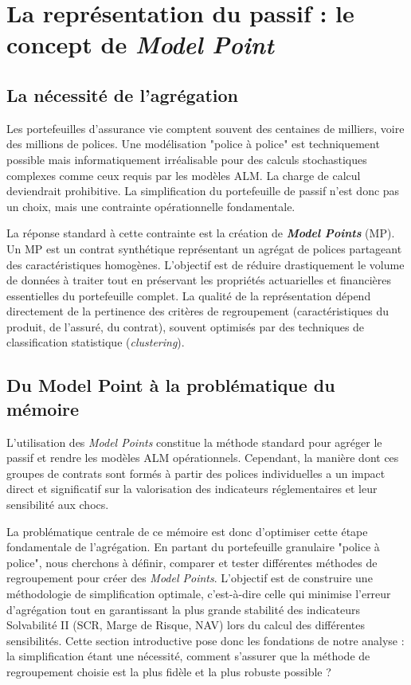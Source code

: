 \section{La représentation du passif : le concept de \textit{Model Point}}
\label{sec:mp}

\subsection{La nécessité de l'agrégation}

Les portefeuilles d'assurance vie comptent souvent des centaines de milliers, voire des millions de polices. Une modélisation "police à police" est techniquement possible mais informatiquement irréalisable pour des calculs stochastiques complexes comme ceux requis par les modèles ALM. La charge de calcul deviendrait prohibitive. La simplification du portefeuille de passif n'est donc pas un choix, mais une contrainte opérationnelle fondamentale.

\bigskip

La réponse standard à cette contrainte est la création de \textbf{\textit{Model Points}} (MP). Un MP est un contrat synthétique représentant un agrégat de polices partageant des caractéristiques homogènes. L'objectif est de réduire drastiquement le volume de données à traiter tout en préservant les propriétés actuarielles et financières essentielles du portefeuille complet. La qualité de la représentation dépend directement de la pertinence des critères de regroupement (caractéristiques du produit, de l'assuré, du contrat), souvent optimisés par des techniques de classification statistique (\textit{clustering}).

\subsection{Du Model Point à la problématique du mémoire}

L'utilisation des \textit{Model Points} constitue la méthode standard pour agréger le passif et rendre les modèles ALM opérationnels. Cependant, la manière dont ces groupes de contrats sont formés à partir des polices individuelles a un impact direct et significatif sur la valorisation des indicateurs réglementaires et leur sensibilité aux chocs.

\bigskip

La problématique centrale de ce mémoire est donc d'optimiser cette étape fondamentale de l'agrégation. En partant du portefeuille granulaire "police à police", nous cherchons à définir, comparer et tester différentes méthodes de regroupement pour créer des \textit{Model Points}. L'objectif est de construire une méthodologie de simplification optimale, c'est-à-dire celle qui minimise l'erreur d'agrégation tout en garantissant la plus grande stabilité des indicateurs Solvabilité II (SCR, Marge de Risque, NAV) lors du calcul des différentes sensibilités. Cette section introductive pose donc les fondations de notre analyse : la simplification étant une nécessité, comment s'assurer que la méthode de regroupement choisie est la plus fidèle et la plus robuste possible ?
